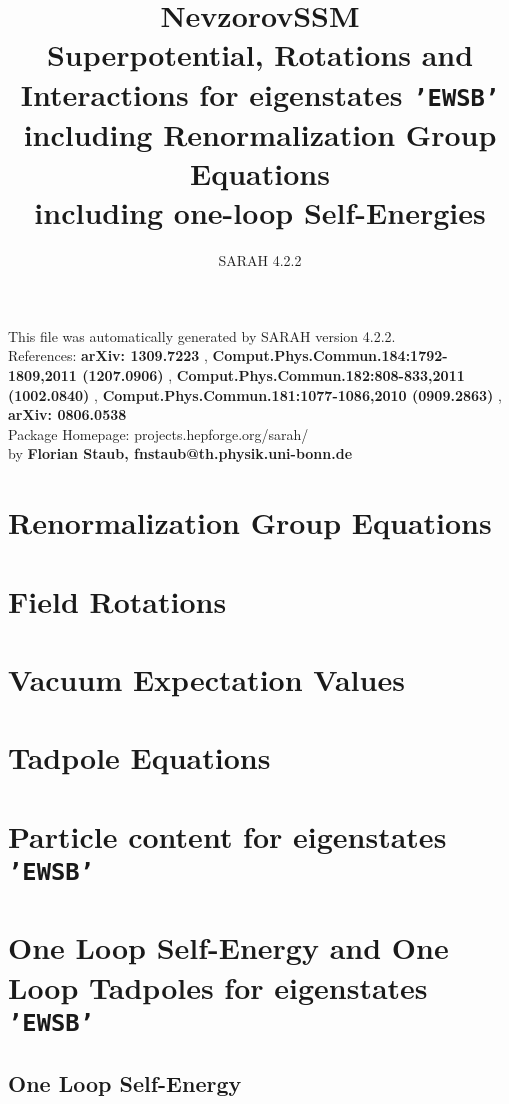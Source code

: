 \documentclass[A4]{article}
\begin{document}
\title{NevzorovSSM\\ Superpotential, Rotations and Interactions for eigenstates {\tt'EWSB'} \\ including Renormalization Group Equations \\ 
including one-loop Self-Energies \\ 
} 
\author{SARAH 4.2.2} 
 \maketitle 
 \vspace{10cm} 
This file was automatically generated by SARAH version 4.2.2.  \\ 
References: {\bf arXiv: 1309.7223 }, {\bf Comput.Phys.Commun.184:1792-1809,2011 (1207.0906) }, {\bf Comput.Phys.Commun.182:808-833,2011 (1002.0840) }, {\bf Comput.Phys.Commun.181:1077-1086,2010 (0909.2863) }, {\bf arXiv: 0806.0538 } \\ 
Package Homepage: projects.hepforge.org/sarah/ \\ 
by {\bf Florian Staub, fnstaub@th.physik.uni-bonn.de} 
 \pagebreak 
 \tableofcontents 
 \pagebreak 
 \allowdisplaybreaks 

\section{Renormalization Group Equations}
 
\section{Field Rotations}
 
 
 
\section{Vacuum Expectation Values}
 
\section{Tadpole Equations}
 
\section{Particle content for eigenstates {\tt 'EWSB'}}
 
\section{One Loop Self-Energy and One Loop Tadpoles for eigenstates {\tt 'EWSB'}}
\subsection{One Loop Self-Energy}
 
\end{document}
